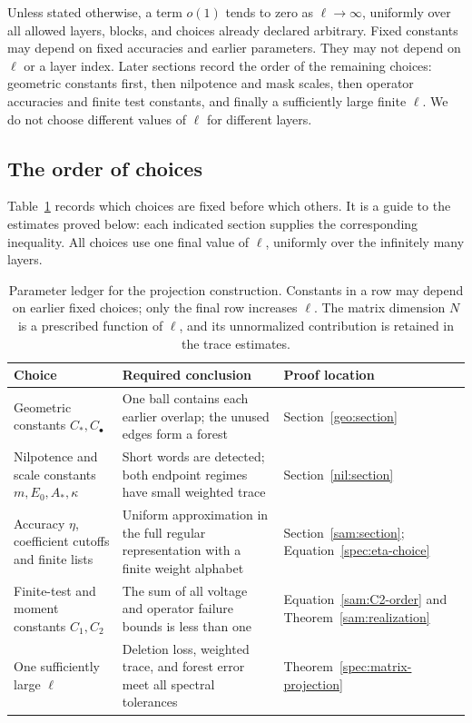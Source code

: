 Unless stated otherwise, a term \(o(1)\) tends to zero as
\(\ell\to\infty\), uniformly over all allowed layers, blocks,
and choices already declared arbitrary.
Fixed constants may depend on fixed accuracies and earlier
parameters. They may not depend on \(\ell\) or a layer index.
Later sections record the order of the remaining choices:
geometric constants first, then nilpotence and mask scales,
then operator accuracies and finite test constants, and
finally a sufficiently large finite \(\ell\).
We do not choose different values of \(\ell\) for different layers.

\subsection{The order of choices}

Table~\ref{tab:projection-parameters} records which choices are fixed before
which others. It is a guide to the estimates proved below: each indicated
section supplies the corresponding inequality. All choices use one final
value of \(\ell\), uniformly over the infinitely many layers.

\begin{table}[htbp]
\centering
\small
\begin{tabular}{@{}>{\raggedright\arraybackslash}p{}>{\raggedright\arraybackslash}p{}>{\raggedright\arraybackslash}p{}@{}}
\toprule
Choice & Required conclusion & Proof location \\
\midrule
Geometric constants \(C_*,C_\bullet\) &
One ball contains each earlier overlap; the unused edges form a forest &
Section~\ref{geo:section} \\[3pt]
Nilpotence and scale constants \(m,E_0,A_*,\kappa\) &
Short words are detected; both endpoint regimes have small weighted trace &
Section~\ref{nil:section} \\[3pt]
Accuracy \(\eta\), coefficient cutoffs and finite lists &
Uniform approximation in the full regular representation with a finite weight alphabet &
Section~\ref{sam:section}; Equation~\eqref{spec:eta-choice} \\[3pt]
Finite-test and moment constants \(C_1,C_2\) &
The sum of all voltage and operator failure bounds is less than one &
Equation~\eqref{sam:C2-order} and Theorem~\ref{sam:realization} \\[3pt]
One sufficiently large \(\ell\) &
Deletion loss, weighted trace, and forest error meet all spectral tolerances &
Theorem~\ref{spec:matrix-projection} \\
\bottomrule
\end{tabular}
\caption{Parameter ledger for the projection construction. Constants in a row
may depend on earlier fixed choices; only the final row increases \(\ell\).
The matrix dimension \(N\) is a prescribed function of \(\ell\), and its
unnormalized contribution is retained in the trace estimates.}
\label{tab:projection-parameters}
\end{table}
